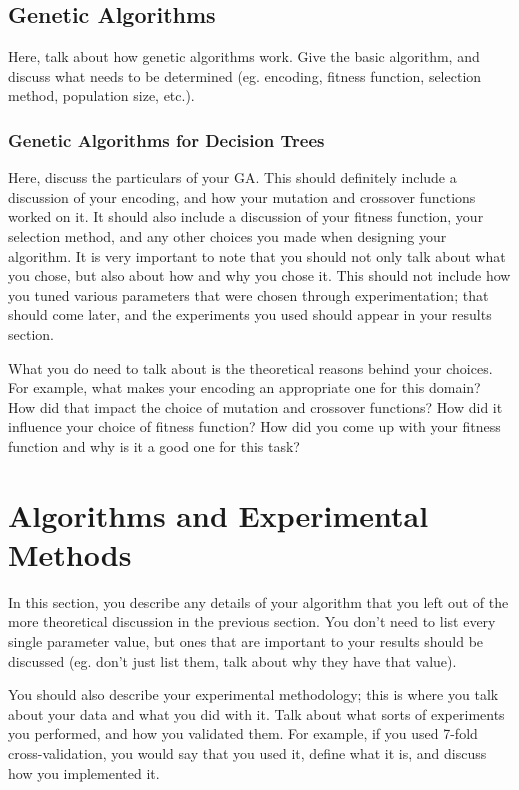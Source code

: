 \documentclass[12pt,letterpaper]{article}
\begin{document}
\subsection{Genetic Algorithms}
Here, talk about how genetic algorithms work.  Give the basic algorithm, and
discuss what needs to be determined (eg. encoding, fitness function, selection
method, population size, etc.).

\subsubsection*{Genetic Algorithms for Decision Trees}
Here, discuss the particulars of your GA.  This should definitely include a
discussion of your encoding, and how your mutation and crossover functions
worked on it.  It should also include a discussion of your fitness function,
your selection method, and any other choices you made when designing your
algorithm.  It is very important to note that you should not only talk about
what you chose, but also about how and why you chose it.  This should not
include how you tuned various parameters that were chosen through
experimentation; that should come later, and the experiments you used should
appear in your results section.

What you do need to talk about is the theoretical reasons behind your choices.
For example, what makes your encoding an appropriate one for this domain?  How
did that impact the choice of mutation and crossover functions?  How did it
influence your choice of fitness function?  How did you come up with your
fitness function and why is it a good one for this task? 

\section{Algorithms and Experimental Methods}

In this section, you describe any details of your algorithm that you left out of
the more theoretical discussion in the previous section.  You don't need to list
every single parameter value, but ones that are important to your results should
be discussed (eg. don't just list them, talk about why they have that value).

You should also describe your experimental methodology; this is where you talk
about your data and what you did with it.  Talk about what sorts of experiments
you performed, and how you validated them.  For example, if you used 7-fold
cross-validation, you would say that you used it, define what it is, and discuss
how you implemented it.  
\end{document}
